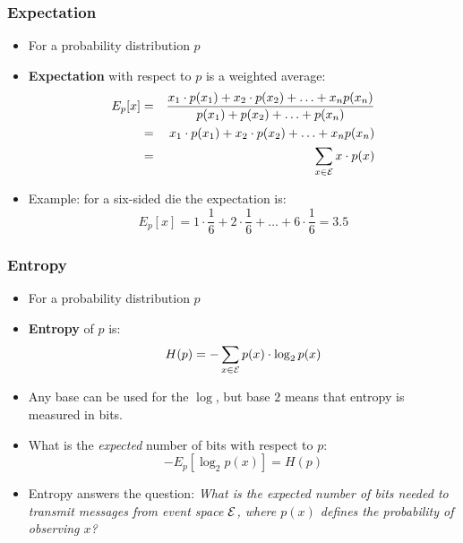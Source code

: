 \begin{frame}[fragile]
\frametitle{Expectation}
\begin{itemize}[<+->]
\item For a probability distribution $p$
\item \textbf{Expectation} with respect to $p$ is a weighted average:
\begin{eqnarray*}
 E_p[x] &=& \frac{x_1 \cdot p(x_1) + x_2 \cdot p(x_2) + \ldots + x_n p(x_n)}{p(x_1) + p(x_2) + \ldots + p(x_n)} \\
  &=& x_1 \cdot p(x_1) + x_2 \cdot p(x_2) + \ldots + x_n p(x_n) \\
  &=& \sum_{x \in {\cal E}} x \cdot p(x) 
\end{eqnarray*}
\item Example: for a six-sided die the expectation is:
\[ E_p[x] = 1 \cdot \frac{1}{6} + 2 \cdot \frac{1}{6} + \ldots + 6 \cdot \frac{1}{6} = 3.5 \]
\end{itemize}

\end{frame}

\begin{frame}
\frametitle{Entropy}
\begin{itemize}[<+->]
\item For a probability distribution $p$
\item \textbf{Entropy} of $p$ is: 
\[ H(p) = - \sum_{x \in {\cal E}} p(x) \cdot \log_2 p(x) \]
\item Any base can be used for the $\log$, but base $2$ means
  that entropy is measured in bits.
\item What is the {\it expected} number of bits with respect to $p$:
\[ - E_p [ \log_2 p(x) ] = H(p) \]
\item Entropy answers the question: {\it What is the expected
  number of bits needed to transmit messages from event 
  space ${\cal E}$, where $p(x)$ defines the probability of observing $x$?} 
\end{itemize}

\end{frame}


